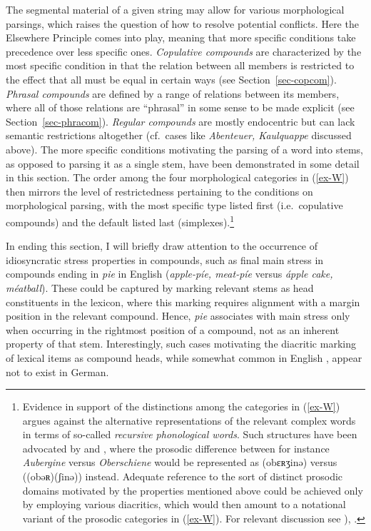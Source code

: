 \documentclass[output=paper
 ,nobabel
 ,draftmode
 ,colorlinks, citecolor=brown
]{langscibook}
\begin{document}
\noindent
The segmental material of a given string may allow for various morphological parsings, which raises
the question of how to resolve potential conflicts. Here the Elsewhere Principle comes into play,
meaning that more specific conditions take precedence over less specific ones. \emph{Copulative
  compounds} are characterized by the most specific condition in that the relation between all
members is restricted to the effect that all must be equal in certain ways (see
Section~\ref{sec-copcom}). \emph{Phrasal compounds} are defined by a range of relations between its
members, where all of those relations are ``phrasal'' in some sense to be made explicit (see
Section~\ref{sec-phracom}). \emph{Regular compounds} are mostly endocentric but can lack semantic
restrictions altogether (cf.\ cases like \emph{Abenteuer, Kaulquappe} discussed above). The more
specific conditions motivating the parsing of a word into stems, as opposed to parsing it as a
single stem, have been demonstrated in some detail in this section. The order among the four
morphological categories in (\ref{ex-W}) then mirrors the level of restrictedness pertaining to the
conditions on morphological parsing, with the most specific type listed first (i.e.\ copulative
compounds) and the default listed last (simplexes).\footnote{\label{fn-any-evidence}Evidence in
  support of the distinctions among the categories in (\ref{ex-W}) argues against the alternative
  representations of the relevant complex words in terms of so-called \emph{recursive phonological
    words}. Such structures have been advocated by \citet[6]{McCarthyPrince1993} and
  \citet{ItoMester2009}, where the prosodic difference between for instance \emph{Aubergine} versus
  \emph{Oberschiene} would be represented as (obɛʀʒinə) versus
  ((obəʀ)(ʃinə)) instead. Adequate reference to the sort of distinct prosodic
  domains motivated by the properties mentioned above could be achieved only by employing various
  diacritics, which would then amount to a notational variant of the prosodic categories in
  (\ref{ex-W}). For relevant discussion see \citep[xvii]{NesporVogel2007}),
  \citep[150--152]{Vogel2010}.}  


In ending this section, I will briefly draw attention to the occurrence of idiosyncratic stress properties in compounds, such as final main stress in compounds ending in \emph{pie} in English (\eg \emph{apple-píe,  meat-píe} versus \emph{ápple cake, méatball}). These could be captured by marking relevant stems as head constituents in the lexicon, where this marking requires alignment with a margin position in the relevant compound. Hence, \emph{pie} associates with main stress only when occurring in the rightmost position of a compound, not as an inherent property of that stem. Interestingly, such cases motivating the diacritic marking of lexical items as compound heads, while somewhat common in English \citep[144--149]{Fudge1984}, appear not to exist in German.
\end{document}
